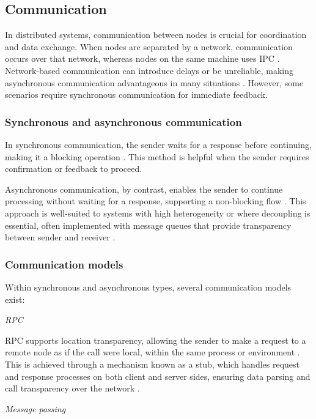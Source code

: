 \subsection{Communication}

In distributed systems, communication between nodes is crucial for coordination and data exchange. When nodes are separated by a network, communication occurs over that network, whereas nodes on the same machine uses \gls{IPC} \cite{Vitillo2021}. Network-based communication can introduce delays or be unreliable, making asynchronous communication advantageous in many situations \cite{Yuan2020}. However, some scenarios require synchronous communication for immediate feedback.

\subsubsection{Synchronous and asynchronous communication}

In synchronous communication, the sender waits for a response before continuing, making it a blocking operation \cite{Tanenbaum2023, Coulouris2012}. This method is helpful when the sender requires confirmation or feedback to proceed.

Asynchronous communication, by contrast, enables the sender to continue processing without waiting for a response, supporting a non-blocking flow \cite{Tanenbaum2023, Glabbeek2008}. This approach is well-suited to systems with high heterogeneity or where decoupling is essential, often implemented with message queues that provide transparency between sender and receiver \cite{Tanenbaum2023}.

\subsubsection{Communication models}

Within synchronous and asynchronous types, several communication models exist:

\textit{\gls{RPC}}

\gls{RPC} supports location transparency, allowing the sender to make a request to a remote node as if the call were local, within the same process or environment \cite{Kleppmann2017, Coulouris2012}. This is achieved through a mechanism known as a stub, which handles request and response processes on both client and server sides, ensuring data parsing and call transparency over the network \cite{Tanenbaum2023}.

\textit{Message passing}

